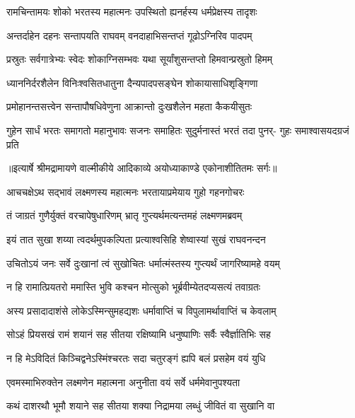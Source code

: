 \twolineshloka
{रामचिन्तामयः शोको भरतस्य महात्मनः}
{उपस्थितो ह्यनर्हस्य धर्मप्रेक्षस्य तादृशः} %

\twolineshloka
{अन्तर्दाहेन दहनः सन्तापयति राघवम्}
{वनदाहाभिसन्तप्तं गूढोऽग्निरिव पादपम्} %

\twolineshloka
{प्रस्रुतः सर्वगात्रेभ्यः स्वेदः शोकाग्निसम्भवः}
{यथा सूर्यांशुसन्तप्तो हिमवान्प्रस्रुतो हिमम्} %

\twolineshloka
{ध्याननिर्दरशैलेन विनिःश्वसितधातुना}
{दैन्यपादपसङ्घेन शोकायासाधिशृङ्गिणा} %

\twolineshloka
{प्रमोहानन्तसत्त्वेन सन्तापौषधिवेणुना}
{आक्रान्तो दुःखशैलेन महता कैकयीसुतः} %

\fourlineindentedshloka
{गुहेन सार्धं भरतः समागतो}
{महानुभावः सजनः समाहितः}
{सुदुर्मनास्तं भरतं तदा पुनर्-}
{गुहः समाश्वासयदग्रजं प्रति} %


{॥इत्यार्षे श्रीमद्रामायणे वाल्मीकीये आदिकाव्ये अयोध्याकाण्डे एकोनाशीतितमः सर्गः॥}


\twolineshloka
{आचचक्षेऽथ सद्भावं लक्ष्मणस्य महात्मनः}
{भरतायाप्रमेयाय गुहो गहनगोचरः} %

\twolineshloka
{तं जाग्रतं गुणैर्युक्तं वरचापेषुधारिणम्}
{भ्रातृ गुप्त्यर्थमत्यन्तमहं लक्ष्मणमब्रवम्} %

\twolineshloka
{इयं तात सुखा शय्या त्वदर्थमुपकल्पिता}
{प्रत्याश्वसिहि शेष्वास्यां सुखं राघवनन्दन} %

\twolineshloka
{उचितोऽयं जनः सर्वे दुःखानां त्वं सुखोचितः}
{धर्मात्मंस्तस्य गुप्त्यर्थं जागरिष्यामहे वयम्} %

\twolineshloka
{न हि रामात्प्रियतरो ममास्ति भुवि कश्चन}
{मोत्सुको भूर्ब्रवीम्येतदप्यसत्यं तवाग्रतः} %

\twolineshloka
{अस्य प्रसादादाशंसे लोकेऽस्मिन्सुमहद्यशः}
{धर्मावाप्तिं च विपुलामर्थावाप्तिं च केवलाम्} %

\twolineshloka
{सोऽहं प्रियसखं रामं शयानं सह सीतया}
{रक्षिष्यामि धनुष्पाणिः सर्वैः स्वैर्ज्ञातिभिः सह} %

\twolineshloka
{न हि मेऽविदितं किञ्चिद्वनेऽस्मिंश्चरतः सदा}
{चतुरङ्गं ह्यपि बलं प्रसहेम वयं युधि} %

\twolineshloka
{एवमस्माभिरुक्तेन लक्ष्मणेन महात्मना}
{अनुनीता वयं सर्वे धर्ममेवानुपश्यता} %

\twolineshloka
{कथं दाशरथौ भूमौ शयाने सह सीतया}
{शक्या निद्रामया लब्धुं जीवितं वा सुखानि वा} %

